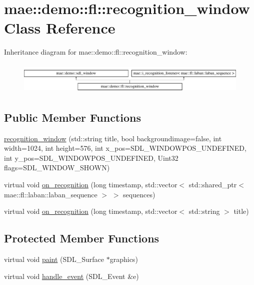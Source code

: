 \hypertarget{classmae_1_1demo_1_1fl_1_1recognition__window}{\section{mae\-:\-:demo\-:\-:fl\-:\-:recognition\-\_\-window Class Reference}
\label{classmae_1_1demo_1_1fl_1_1recognition__window}
}
Inheritance diagram for mae\-:\-:demo\-:\-:fl\-:\-:recognition\-\_\-window\-:\begin{figure}[H]
\begin{center}
\leavevmode
\includegraphics[height=1.534247cm]{classmae_1_1demo_1_1fl_1_1recognition__window}
\end{center}
\end{figure}
\subsection*{Public Member Functions}
\begin{DoxyCompactItemize}
\item 
\hyperlink{classmae_1_1demo_1_1fl_1_1recognition__window_a5eaeeccf36240c58df2aadeb6dd62439}{recognition\-\_\-window} (std\-::string title, bool backgroundimage=false, int width=1024, int height=576, int x\-\_\-pos=S\-D\-L\-\_\-\-W\-I\-N\-D\-O\-W\-P\-O\-S\-\_\-\-U\-N\-D\-E\-F\-I\-N\-E\-D, int y\-\_\-pos=S\-D\-L\-\_\-\-W\-I\-N\-D\-O\-W\-P\-O\-S\-\_\-\-U\-N\-D\-E\-F\-I\-N\-E\-D, Uint32 flags=S\-D\-L\-\_\-\-W\-I\-N\-D\-O\-W\-\_\-\-S\-H\-O\-W\-N)
\item 
virtual void \hyperlink{classmae_1_1demo_1_1fl_1_1recognition__window_a5f03f86740aac9b8c3f672d69d617bde}{on\-\_\-recognition} (long timestamp, std\-::vector$<$ std\-::shared\-\_\-ptr$<$ mae\-::fl\-::laban\-::laban\-\_\-sequence $>$ $>$ sequences)
\item 
virtual void \hyperlink{classmae_1_1demo_1_1fl_1_1recognition__window_a461cde34e9508178681124772dd1af08}{on\-\_\-recognition} (long timestamp, std\-::vector$<$ std\-::string $>$ title)
\end{DoxyCompactItemize}
\subsection*{Protected Member Functions}
\begin{DoxyCompactItemize}
\item 
virtual void \hyperlink{classmae_1_1demo_1_1fl_1_1recognition__window_a6be01c15215a8c705ebd5fe7b11f7b08}{paint} (S\-D\-L\-\_\-\-Surface $\ast$graphics)
\item 
virtual void \hyperlink{classmae_1_1demo_1_1fl_1_1recognition__window_a5ad1854bdbe05a3a7cc73c4a1b658236}{handle\-\_\-event} (S\-D\-L\-\_\-\-Event \&e)
\end{DoxyCompactItemize}
